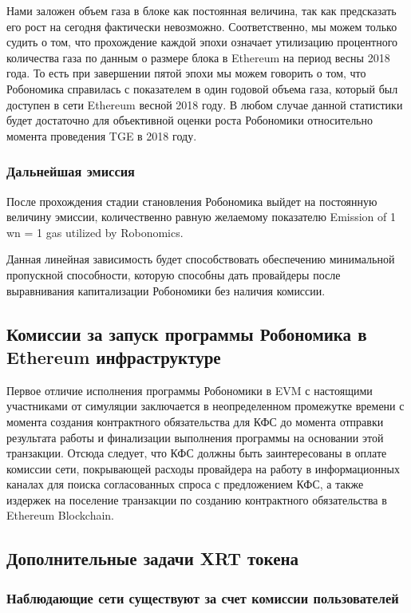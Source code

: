 \documentclass{article}
\begin{document}
Нами заложен объем газа в блоке как постоянная величина, так как предсказать его рост на сегодня фактически невозможно. Соответственно, мы можем только судить о том, что прохождение каждой эпохи означает утилизацию процентного количества газа по данным о размере блока в Ethereum на период весны 2018 года. То есть при завершении пятой эпохи мы можем говорить о том, что Робономика справилась с показателем в один годовой объема газа, который был доступен в сети Ethereum весной 2018 году. В любом случае данной статистики будет достаточно для объективной оценки роста Робономики относительно момента проведения TGE в 2018 году.

\subsubsection{Дальнейшая эмиссия}

После прохождения стадии становления Робономика выйдет на постоянную величину эмиссии, количественно равную желаемому показателю Emission of 1 wn = 1 gas utilized by Robonomics.

Данная линейная зависимость будет способствовать обеспечению минимальной пропускной способности, которую способны дать провайдеры после выравнивания капитализации Робономики без наличия комиссии.

\subsection{Комиссии за запуск программы Робономика в Ethereum инфраструктуре}

Первое отличие исполнения программы Робономики в EVM с настоящими участниками от симуляции заключается в неопределенном промежутке времени с момента создания контрактного обязательства для КФС до момента отправки результата работы и финализации выполнения программы на основании этой транзакции. Отсюда следует, что КФС должны быть заинтересованы в оплате комиссии сети, покрывающей расходы провайдера на работу в информационных каналах для поиска согласованных спроса с предложением КФС, а также издержек на поселение транзакции по созданию контрактного обязательства в Ethereum Blockchain. 

\subsection{Дополнительные задачи XRT токена}
\subsubsection{Наблюдающие сети существуют за счет комиссии пользователей}
\end{document}
